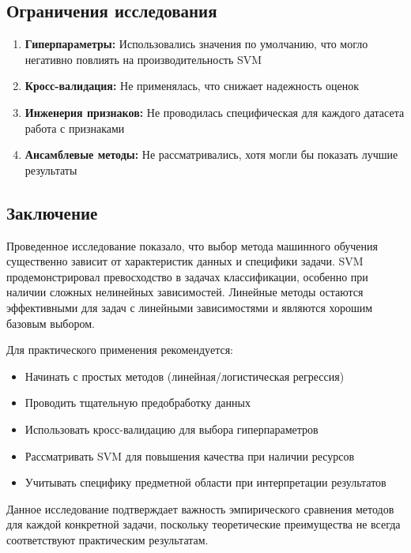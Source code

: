 \documentclass[a4paper]{article}
\begin{document}
\subsection{Ограничения исследования}

\begin{enumerate}
    \item \textbf{Гиперпараметры:} Использовались значения по умолчанию, что могло негативно повлиять на производительность SVM
    \item \textbf{Кросс-валидация:} Не применялась, что снижает надежность оценок
    \item \textbf{Инженерия признаков:} Не проводилась специфическая для каждого датасета работа с признаками
    \item \textbf{Ансамблевые методы:} Не рассматривались, хотя могли бы показать лучшие результаты
\end{enumerate}

\subsection{Заключение}

Проведенное исследование показало, что выбор метода машинного обучения существенно зависит от характеристик данных и специфики задачи. SVM продемонстрировал превосходство в задачах классификации, особенно при наличии сложных нелинейных зависимостей. Линейные методы остаются эффективными для задач с линейными зависимостями и являются хорошим базовым выбором.

Для практического применения рекомендуется:
\begin{itemize}
    \item Начинать с простых методов (линейная/логистическая регрессия)
    \item Проводить тщательную предобработку данных
    \item Использовать кросс-валидацию для выбора гиперпараметров
    \item Рассматривать SVM для повышения качества при наличии ресурсов
    \item Учитывать специфику предметной области при интерпретации результатов
\end{itemize}

Данное исследование подтверждает важность эмпирического сравнения методов для каждой конкретной задачи, поскольку теоретические преимущества не всегда соответствуют практическим результатам.
\end{document}
